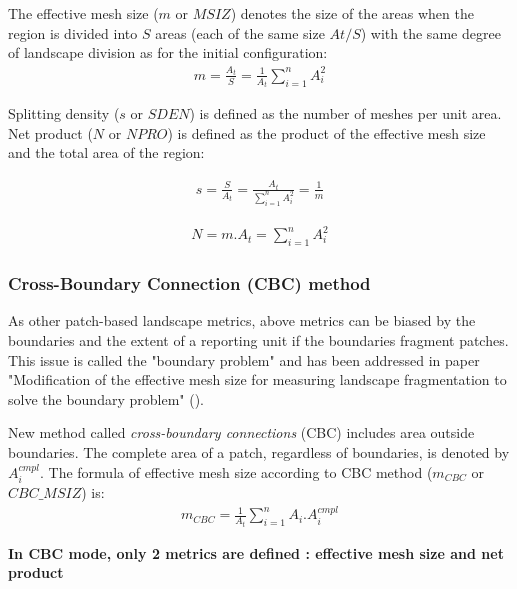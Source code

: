 \documentclass[11pt]{article}
\newcommand{\mycite}[1]{ (\cite{#1})}
\begin{document}
The effective mesh size ($m$ or $MSIZ$) denotes the size of the areas when the region is divided into $S$ areas (each of the same size $At/S$) with the same degree of landscape division as for the initial configuration:
\begin{align*}
m = \frac{A_{t}}{S} = \frac{1}{A_{t}}\sum_{i=1}^{n}A_{i}^{2}
\end{align*}

Splitting density ($s$ or $SDEN$) is defined as the number of meshes per unit area.
Net product ($N$ or $NPRO$) is defined as the product of the effective mesh size and the total area of the region:

\hspace*{-0.5cm}
\begin{minipage}[c][1cm]{.46\linewidth}
\begin{align*}
s = \frac{S}{A_{t}} = \frac{A_{t}}{\sum_{i=1}^{n}A_{i}^{2}} = \frac{1}{m}
\end{align*}
\end{minipage}
\begin{minipage}[c][1cm]{.46\linewidth}
\begin{align*}
N = m.{A_{t}} = \sum_{i=1}^{n}A_{i}^{2}
\end{align*}
\end{minipage}


\subsubsection{Cross-Boundary Connection (CBC) method}
\label{sec:cbc}

As other patch-based landscape metrics, above metrics can be biased by the boundaries and the extent of a reporting unit if the boundaries fragment patches. This issue is called the "boundary problem" and has been addressed  in paper "Modification of the effective mesh size for measuring landscape fragmentation to solve the boundary problem"\mycite{moser}.

New method called \textit{cross-boundary connections} (CBC) includes area outside boundaries. The complete area of a patch, regardless of boundaries, is denoted by $A_{i}^{cmpl}$. The formula of effective mesh size according to CBC method ($m_{CBC}$ or $CBC\_MSIZ$) is:
\begin{align*}
m_{CBC} = \frac{1}{A_{t}}\sum_{i=1}^{n}A_{i}.A_{i}^{cmpl}
\end{align*}

\textbf{\color{red}In CBC mode, only 2 metrics are defined : effective mesh size and net product}
\frameboxend
\end{document}
